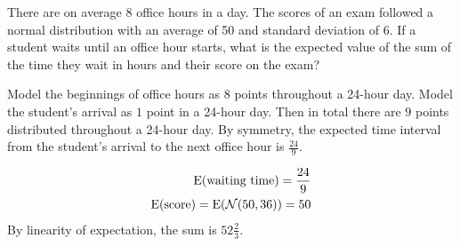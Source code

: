 \question There are on average 8 office hours in a day. The scores of an exam 
followed a normal distribution with an average of 50 and standard 
deviation of 6. If a student waits until an office hour starts, what 
is the expected value of the sum of the time they wait in hours and 
their score on the exam?

\begin{solution}[0.5cm]
    Model the beginnings of office hours as $8$ points throughout a 24-hour day.
    Model the student's arrival as $1$ point in a 24-hour day.
    Then in total there are $9$ points distributed throughout a 24-hour day.
    By symmetry, the expected time interval from the student's arrival to the next office hour is $\frac{24}{9}$.

    \begin{align*}
        \text{E}(\text{waiting time}) = \frac{24}{9} \\
        \text{E}(\text{score}) = \text{E}(\mathcal{N}(50, 36)) = 50 \\
    \end{align*}
By linearity of expectation, the sum is $52 \frac{2}{3}$.

\end{solution}
 
